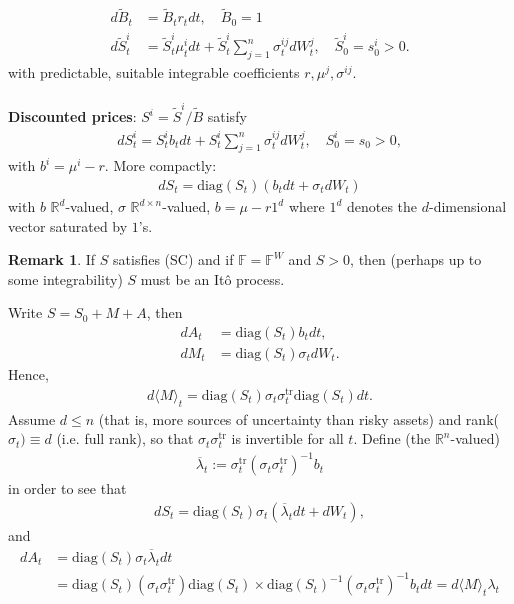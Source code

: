 \documentclass[12pt,a4paper, twoside]{article}
\theoremstyle{definition}
\newtheorem{rem}{Remark}[section]
\begin{document}
\begin{align*}
d \widetilde{B}_t &= \widetilde{B}_t r_t dt, \quad \widetilde{B}_0=1 \\
d \widetilde{S}_t^i &= \widetilde{S}_t^i \mu_t^i dt + \widetilde{S}_t^i \sum_{j=1}^n \sigma_t^{ij} d W_t^j, \quad \widetilde{S}_0^i = s_0^i >0.
\end{align*}
with predictable, suitable integrable coefficients $r, \mu^j, \sigma^{ij}$. 
\\\\
\textbf{Discounted prices}: $S^i = \widetilde{S}^i/ \widetilde{B}$ satisfy 
\begin{align*}
dS_t^i = S_t^i b_tdt + S_t^i \sum_{j=1}^n \sigma_t^{ij} dW_t^j, \quad S_0^i=s_0 >0,
\end{align*}
with $b^i= \mu^i-r$. More compactly: 
\begin{align*}
dS_t = \text{diag}(S_t) (b_t dt + \sigma_t dW_t)
\end{align*}
with $b$ $\mathbb{R}^d$-valued, $\sigma$ $\mathbb{R}^{d \times n}$-valued, $b= \mu-r 1^d$ where $1^d$ denotes the $d$-dimensional vector saturated by $1$'s. 
\begin{rem} If $S$ satisfies (SC) and if $\mathbb{F}= \mathbb{F}^W$ and $S>0$, then (perhaps up to some integrability) $S$ must be an Itô process.
\end{rem}
Write $S= S_0 + M + A$, then 
\begin{align*}
dA_t &= \text{diag}(S_t) b_tdt, \\
dM_t &= \text{diag}(S_t)\sigma_t dW_t.
\end{align*}
Hence, 
\begin{align*}
d \langle M \rangle_t = \text{diag} (S_t) \sigma_t \sigma_t^\text{tr} \text{diag}(S_t)dt.
\end{align*}
Assume $d \leq n$ (that is, more sources of uncertainty than risky assets) and rank($\sigma_t) \equiv d$ (i.e. full rank), so that $\sigma_t \sigma_t^\text{tr}$ is invertible for all $t$. Define (the $\mathbb{R}^n$-valued)
\begin{align*}
\overline{\lambda}_t := \sigma_t^\text{tr}(\sigma_t \sigma_t^\text{tr})^{-1} b_t
\end{align*}
in order to see that
\newpage
\begin{align*}
dS_t = \text{diag}(S_t) \sigma_t(\overline{\lambda}_t dt + dW_t),
\end{align*}
and 
\begin{align*}
dA_t &= \text{diag}(S_t) \sigma_t  \overline{\lambda}_t dt \\
&= \text{diag}(S_t)(\sigma_t \sigma_t^\text{tr}) \text{diag}(S_t) \times \text{diag}(S_t)^{-1} ( \sigma_t \sigma_t^\text{tr})^{-1} b_t dt = d \langle M \rangle_t \lambda_t
\end{align*}
\end{document}
